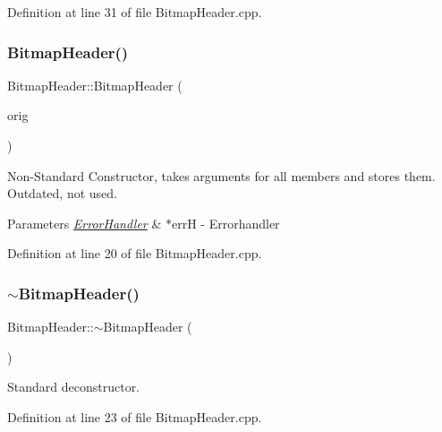 Definition at line 31 of file Bitmap\+Header.\+cpp.

\mbox{\label{classBitmapHeader_a25a5481f49d70a8c42a9efc17f17fd48}} 
\subsubsection{\texorpdfstring{BitmapHeader()}{BitmapHeader()}\hspace{0.1cm}{\footnotesize\ttfamily [4/4]}}
{\footnotesize\ttfamily Bitmap\+Header\+::\+Bitmap\+Header (\begin{DoxyParamCaption}\item[{const \mbox{\hyperlink{classBitmapHeader}{Bitmap\+Header}} \&}]{orig }\end{DoxyParamCaption})}



Non-\/\+Standard Constructor, takes arguments for all members and stores them. Outdated, not used. 


\begin{DoxyParams}{Parameters}
{\em \mbox{\hyperlink{classErrorHandler}{Error\+Handler}}} & $\ast$errH -\/ Errorhandler \\
\hline
\end{DoxyParams}


Definition at line 20 of file Bitmap\+Header.\+cpp.

\mbox{\label{classBitmapHeader_a4e102d5fe9a8619fca7319b148ec23d1}} 
\subsubsection{\texorpdfstring{$\sim$BitmapHeader()}{~BitmapHeader()}}
{\footnotesize\ttfamily Bitmap\+Header\+::$\sim$\+Bitmap\+Header (\begin{DoxyParamCaption}{ }\end{DoxyParamCaption})\hspace{0.3cm}{\ttfamily [virtual]}}

Standard deconstructor. 

Definition at line 23 of file Bitmap\+Header.\+cpp.



